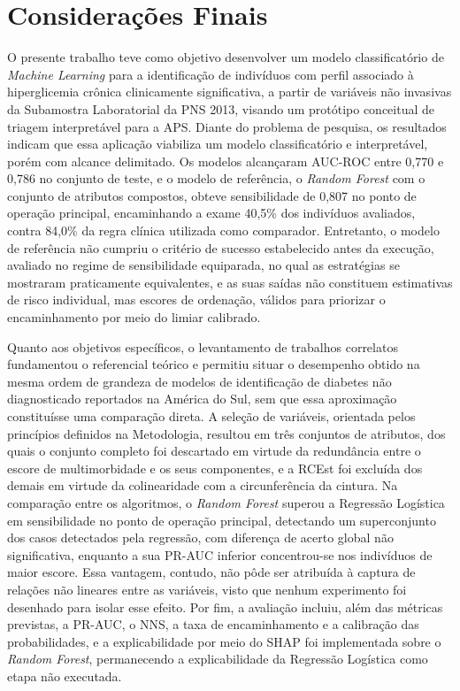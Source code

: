 \chapter{Considerações Finais}\label{cap:consideracoesfinais}

O presente trabalho teve como objetivo desenvolver um modelo classificatório de \textit{Machine Learning} para a identificação de indivíduos com perfil associado à hiperglicemia crônica clinicamente significativa, a partir de variáveis não invasivas da Subamostra Laboratorial da PNS 2013, visando um protótipo conceitual de triagem interpretável para a APS. Diante do problema de pesquisa, os resultados indicam que essa aplicação viabiliza um modelo classificatório e interpretável, porém com alcance delimitado. Os modelos alcançaram AUC-ROC entre 0,770 e 0,786 no conjunto de teste, e o modelo de referência, o \textit{Random Forest} com o conjunto de atributos compostos, obteve sensibilidade de 0,807 no ponto de operação principal, encaminhando a exame 40,5\% dos indivíduos avaliados, contra 84,0\% da regra clínica utilizada como comparador. Entretanto, o modelo de referência não cumpriu o critério de sucesso estabelecido antes da execução, avaliado no regime de sensibilidade equiparada, no qual as estratégias se mostraram praticamente equivalentes, e as suas saídas não constituem estimativas de risco individual, mas escores de ordenação, válidos para priorizar o encaminhamento por meio do limiar calibrado.

Quanto aos objetivos específicos, o levantamento de trabalhos correlatos fundamentou o referencial teórico e permitiu situar o desempenho obtido na mesma ordem de grandeza de modelos de identificação de diabetes não diagnosticado reportados na América do Sul, sem que essa aproximação constituísse uma comparação direta. A seleção de variáveis, orientada pelos princípios definidos na Metodologia, resultou em três conjuntos de atributos, dos quais o conjunto completo foi descartado em virtude da redundância entre o escore de multimorbidade e os seus componentes, e a RCEst foi excluída dos demais em virtude da colinearidade com a circunferência da cintura. Na comparação entre os algoritmos, o \textit{Random Forest} superou a Regressão Logística em sensibilidade no ponto de operação principal, detectando um superconjunto dos casos detectados pela regressão, com diferença de acerto global não significativa, enquanto a sua PR-AUC inferior concentrou-se nos indivíduos de maior escore. Essa vantagem, contudo, não pôde ser atribuída à captura de relações não lineares entre as variáveis, visto que nenhum experimento foi desenhado para isolar esse efeito. Por fim, a avaliação incluiu, além das métricas previstas, a PR-AUC, o NNS, a taxa de encaminhamento e a calibração das probabilidades, e a explicabilidade por meio do SHAP foi implementada sobre o \textit{Random Forest}, permanecendo a explicabilidade da Regressão Logística como etapa não executada.

